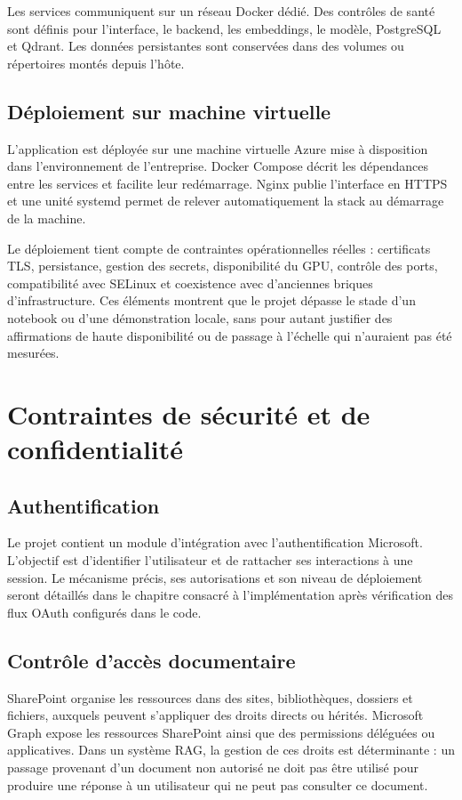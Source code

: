 Les services communiquent sur un réseau Docker dédié. Des contrôles de santé sont définis pour l'interface, le backend, les embeddings, le modèle, PostgreSQL et Qdrant. Les données persistantes sont conservées dans des volumes ou répertoires montés depuis l'hôte.

\subsection{Déploiement sur machine virtuelle}

L'application est déployée sur une machine virtuelle Azure mise à disposition dans l'environnement de l'entreprise. Docker Compose décrit les dépendances entre les services et facilite leur redémarrage. Nginx publie l'interface en HTTPS et une unité systemd permet de relever automatiquement la stack au démarrage de la machine.

Le déploiement tient compte de contraintes opérationnelles réelles : certificats TLS, persistance, gestion des secrets, disponibilité du GPU, contrôle des ports, compatibilité avec SELinux et coexistence avec d'anciennes briques d'infrastructure. Ces éléments montrent que le projet dépasse le stade d'un notebook ou d'une démonstration locale, sans pour autant justifier des affirmations de haute disponibilité ou de passage à l'échelle qui n'auraient pas été mesurées.

\section{Contraintes de sécurité et de confidentialité}

\subsection{Authentification}

Le projet contient un module d'intégration avec l'authentification Microsoft. L'objectif est d'identifier l'utilisateur et de rattacher ses interactions à une session. Le mécanisme précis, ses autorisations et son niveau de déploiement seront détaillés dans le chapitre consacré à l'implémentation après vérification des flux OAuth configurés dans le code.

\subsection{Contrôle d'accès documentaire}

SharePoint organise les ressources dans des sites, bibliothèques, dossiers et fichiers, auxquels peuvent s'appliquer des droits directs ou hérités. Microsoft Graph expose les ressources SharePoint ainsi que des permissions déléguées ou applicatives. Dans un système RAG, la gestion de ces droits est déterminante : un passage provenant d'un document non autorisé ne doit pas être utilisé pour produire une réponse à un utilisateur qui ne peut pas consulter ce document.

